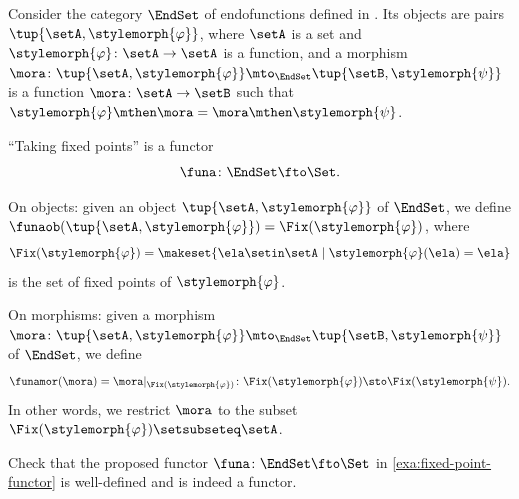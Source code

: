 \begin{example}
    \label{exa:fixed-point-functor}
    Consider the category $\EndSet$ of endofunctions defined in .
    Its objects are pairs $\tup{\setA, \stylemorph{\varphi}}$, where $\setA$ is a set and $\stylemorph{\varphi} \colon \setA \to \setA$ is a function, and a morphism $\mora \colon \tup{\setA, \stylemorph{\varphi}} \mto_\EndSet \tup{\setB, \stylemorph{\psi}}$ is a function $\mora \colon \setA \to \setB$ such that $\stylemorph{\varphi} \mthen \mora = \mora \mthen \stylemorph{\psi}$.

    ``Taking fixed points'' is a functor
    \begin{equation}
        \funa \colon \EndSet \fto \Set.
    \end{equation}

    On objects: given an object $\tup{\setA, \stylemorph{\varphi}}$ of $\EndSet$, we define $\funaob( \tup{\setA, \stylemorph{\varphi}}) = \Fix(\stylemorph{\varphi})$, where
    \begin{equation}
        \Fix(\stylemorph{\varphi}) = \makeset{\ela \setin \setA \mid \stylemorph{\varphi}(\ela) = \ela}
    \end{equation}
    is the set of fixed points of $\stylemorph{\varphi}$.

    On morphisms: given a morphism $\mora \colon \tup{\setA, \stylemorph{\varphi}} \mto_\EndSet \tup{\setB, \stylemorph{\psi}}$ of $\EndSet$, we define
    \begin{equation}
        \funamor(\mora) = \mora \vert_{\Fix(\stylemorph{\varphi})} \colon \Fix(\stylemorph{\varphi}) \sto \Fix(\stylemorph{\psi}).
    \end{equation}
    In other words, we restrict $\mora$ to the subset $\Fix(\stylemorph{\varphi}) \setsubseteq \setA$.
\end{example}

\begin{gradedexercise}
    \label{ex:fixed-point-functor}
    Check that the proposed functor $\funa \colon \EndSet \fto \Set$ in \cref{exa:fixed-point-functor} is well-defined and is indeed a functor.
\end{gradedexercise}

